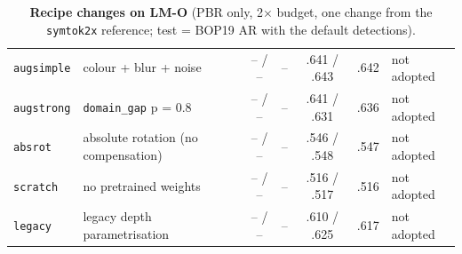 \begin{table}[t]
\begin{tabular}{@{}llccccl@{}}
    \texttt{augsimple} & colour + blur + noise & -- / -- & -- & .641 / .643 & .642 & not adopted \\
    \texttt{augstrong} & \texttt{domain\_gap} p = 0.8 & -- / -- & -- & .641 / .631 & .636 & not adopted \\
    \texttt{absrot} & absolute rotation (no compensation) & -- / -- & -- & .546 / .548 & .547 & not adopted \\
    \texttt{scratch} & no pretrained weights & -- / -- & -- & .516 / .517 & .516 & not adopted \\
    \texttt{legacy} & legacy depth parametrisation & -- / -- & -- & .610 / .625 & .617 & not adopted \\
    \bottomrule
  \end{tabular}
  \caption{\textbf{Recipe changes on LM-O} (PBR only, 2$\times$ budget, one change from the \texttt{symtok2x} reference; test = BOP19 AR with the default detections).}
  \label{tab:cat_recipe}
\end{table}

